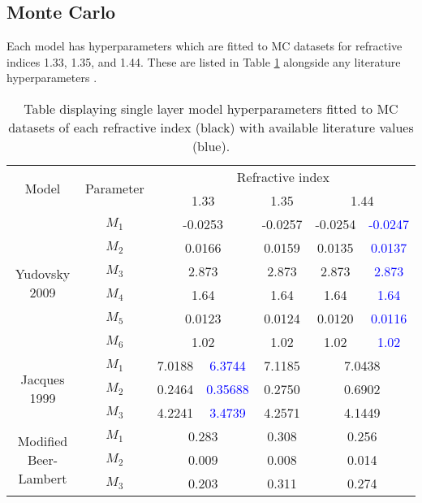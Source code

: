 \subsection{Monte Carlo}\label{sec:resultsMC}
Each model has hyperparameters which are fitted to MC datasets for refractive indices 1.33, 1.35, and 1.44. These are listed in 
Table \ref{tb:fittedmodelparams}
alongside any literature hyperparameters \cite{Jacques1999, Yudovsky2009}.
\begin{table}[htb!]
    \centering
    \caption{Table displaying single layer model hyperparameters fitted to MC datasets of each refractive index (black) with available literature values (blue).}
    \begin{tabular}{|cc|cc|c|cc|}
        \hline
        \multirow{2}{*}{Model} & \multirow{2}{*}{Parameter} & \multicolumn{5}{c|}{Refractive index} \\
         & & \multicolumn{2}{c|}{1.33} & 1.35 & \multicolumn{2}{c|}{1.44} \\
        \hline
        \multirow{6}{*}{Yudovsky 2009} & $M_1$ & \multicolumn{2}{c|}{-0.0253} & -0.0257 & -0.0254 & \textcolor{blue}{-0.0247} \\
        & $M_2$ & \multicolumn{2}{c|}{0.0166} & 0.0159 & 0.0135 & \textcolor{blue}{0.0137} \\
        & $M_3$ & \multicolumn{2}{c|}{2.873} & 2.873 & 2.873 & \textcolor{blue}{2.873} \\
        & $M_4$ & \multicolumn{2}{c|}{1.64} & 1.64 & 1.64 & \textcolor{blue}{1.64} \\
        & $M_5$ & \multicolumn{2}{c|}{0.0123} & 0.0124 & 0.0120 & \textcolor{blue}{0.0116} \\
        & $M_6$ & \multicolumn{2}{c|}{1.02} & 1.02 & 1.02 & \textcolor{blue}{1.02} \\
        \hline 
        \multirow{3}{*}{Jacques 1999} & $M_1$ & 7.0188 & \textcolor{blue}{6.3744} & 7.1185 & \multicolumn{2}{c|}{7.0438} \\
        & $M_2$ & 0.2464 & \textcolor{blue}{0.35688} & 0.2750 & \multicolumn{2}{c|}{0.6902} \\
        & $M_3$ & 4.2241 & \textcolor{blue}{3.4739} & 4.2571 & \multicolumn{2}{c|}{4.1449} \\
        \hline
        \multirow{3}{*}{Modified Beer-Lambert} & $M_1$ & \multicolumn{2}{c|}{0.283} & 0.308 & \multicolumn{2}{c|}{0.256} \\
        & $M_2$ & \multicolumn{2}{c|}{0.009} & 0.008 & \multicolumn{2}{c|}{0.014} \\
        & $M_3$ & \multicolumn{2}{c|}{0.203} & 0.311 & \multicolumn{2}{c|}{0.274} \\
        \hline
    \end{tabular}
    \label{tb:fittedmodelparams}%
\end{table}
